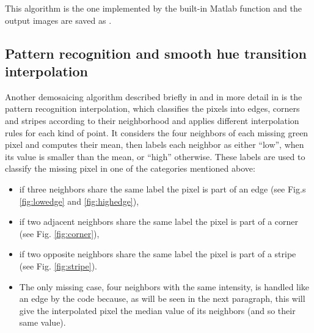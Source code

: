 \documentclass[a4paper,oneside]{article}
\begin{document}
This algorithm is the one implemented by the built-in Matlab function
 and the output images are saved as
.

\subsection{Pattern recognition and smooth hue transition interpolation}
Another demosaicing algorithm described briefly in \cite{demosaic_alg}
and in more detail in \cite{demosaic_army} is the pattern recognition
interpolation, which classifies the pixels into edges, corners and
stripes according to their neighborhood and applies different
interpolation rules for each kind of point.
%
It considers the four neighbors of each missing green pixel and
computes their mean, then labels each neighbor as either ``low'', when
its value is smaller than the mean, or ``high'' otherwise.
%
These labels are used to classify the missing pixel in one of the
categories mentioned above:
\begin{itemize}
\item if three neighbors share the same label the pixel is part of an
  edge (see Fig.s \ref{fig:lowedge} and \ref{fig:highedge}),
\item if two adjacent neighbors share the same label the pixel is part
  of a corner (see Fig. \ref{fig:corner}),
\item
  if two opposite neighbors share the same label the pixel is part of
  a stripe (see Fig. \ref{fig:stripe}).
\item The only missing case, four neighbors with the same intensity, is
  handled like an edge by the code because, as will be seen in the
  next paragraph, this will give the interpolated pixel the median
  value of its neighbors (and so their same value).
\end{itemize}
\end{document}
